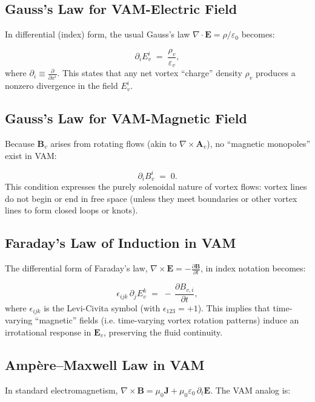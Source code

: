 \subsection{Gauss’s Law for VAM-Electric Field}

In differential (index) form, the usual Gauss’s law \(\nabla\cdot\mathbf{E} = \rho/\varepsilon_0\) becomes:

\[
    \partial_i E_{v}^i
    \;=\;
    \frac{\rho_v}{\varepsilon_v},
    \tag{1}
\]
where \(\partial_i \equiv \frac{\partial}{\partial x^i}\). This states that any net vortex “charge” density \(\rho_v\) produces a nonzero divergence in the field \(E_{v}^i\).

\subsection{Gauss’s Law for VAM-Magnetic Field}

Because \(\mathbf{B}_v\) arises from rotating flows (akin to \(\nabla\times \mathbf{A}_v\)), no “magnetic monopoles” exist in VAM:

\[
    \partial_i B_{v}^i
    \;=\; 0.
    \tag{2}
\]
This condition expresses the purely solenoidal nature of vortex flows: vortex lines do not begin or end in free space (unless they meet boundaries or other vortex lines to form closed loops or knots).

\subsection{Faraday’s Law of Induction in VAM}

The differential form of Faraday’s law, \(\nabla\times \mathbf{E} = -\frac{\partial \mathbf{B}}{\partial t}\), in index notation becomes:

\[
    \epsilon_{ijk}\,\partial_j E_{v}^k
    \;=\;
    -\,\frac{\partial B_{v,i}}{\partial t},
    \tag{3}
\]
where \(\epsilon_{ijk}\) is the Levi-Civita symbol (with \(\epsilon_{123} = +1\)). This implies that time-varying “magnetic” fields (i.e. time-varying vortex rotation patterns) induce an irrotational response in \(\mathbf{E}_v\), preserving the fluid continuity.

\subsection{Ampère--Maxwell Law in VAM}

In standard electromagnetism, \(\nabla\times \mathbf{B} = \mu_0 \mathbf{J} + \mu_0\varepsilon_0\,\partial_t\mathbf{E}\). The VAM analog is:

